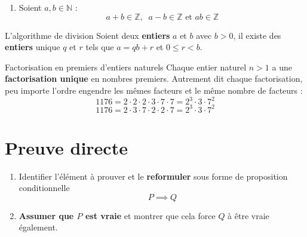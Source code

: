 \documentclass[16pt]{report}
\begin{document}
\begin{multicols*}{2}
\begin{itemize}
\begin{enumerate}
                        \item Soient  $a, b \in \mathbb{N}$ : 
                            \[ a + b \in \mathbb{Z}, \;\; a - b \in \mathbb{Z} \text{  et } ab \in \mathbb{Z} \]
                    \end{enumerate}
            \end{itemize}


            \begin{Theorem}{L'algorithme de division}{}
                        Soient deux \textbf{entiers} $a$ et $b$ avec $b > 0$, il existe des \textbf{entiers} 
                        unique $q$ et $r$ 
                        tels que $a = qb + r$ et $0 \leq r < b$.  
            \end{Theorem}

            \begin{Theorem}{Factorisation en premiers d'entiers naturels}
                        Chaque entier naturel $n > 1$ a une \textbf{factorisation unique} en nombres premiers. 
                        Autrement dit chaque factorisation, peu importe l'ordre engendre les mêmes facteurs 
                        et le même nombre de facteurs : 
                        \[ 1176 = 2 \cdot 2 \cdot 2 \cdot 3 \cdot 7 \cdot 7 = 2^3 \cdot 3 \cdot 7^2 \]
                        \[ 1176 = 2 \cdot 3 \cdot 7 \cdot 2 \cdot 2 \cdot 7 = 2^3 \cdot 3 \cdot 7^2 \]
            \end{Theorem}
           


           
            \section{\textcolor{myp}{\textbf{Preuve directe}}}

            
            \begin{enumerate}
                        \item Identifier l'élément à prouver et le \textbf{reformuler} sous forme de 
                            proposition conditionnelle
                            \[ P \implies  Q \]
                        \item \textbf{Assumer que $P$ est vraie} et montrer que cela force $Q$ à être vraie également. 
                

            \end{enumerate}


\end{multicols*}
\end{document}
